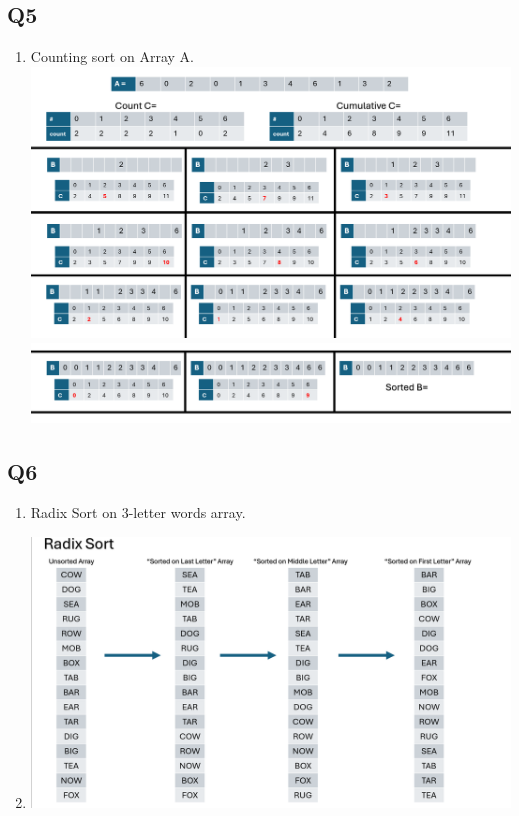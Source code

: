 \documentclass{article}
\begin{document}
\subsection*{Q5}
\begin{enumerate}[label=(\alph*)]
    \item Counting sort on Array A.
    \subitem \includegraphics[width=1\textwidth]{counting1.png}
    \subitem \includegraphics[width=1\textwidth]{counting2.png}
\end{enumerate}

\subsection*{Q6}
\begin{enumerate}[label=(\alph*)]
    \item Radix Sort on 3-letter words array.
    \item \subitem \includegraphics[width=1\textwidth]{radix.png}
\end{enumerate}
\end{document}
